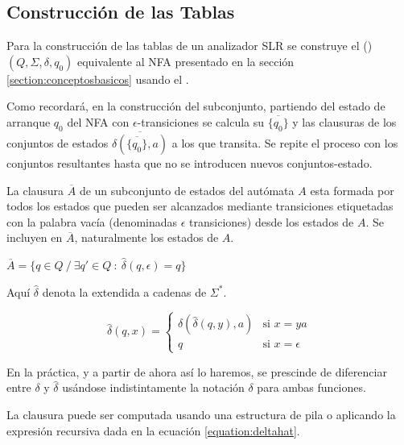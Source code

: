 \subsection{Construcción de las Tablas}
\label{subsection:nfa2dfa}

Para la construcción de las tablas de un analizador SLR
se construye el  () 
$(Q, \Sigma, \delta, q_0)$ equivalente al NFA 
presentado en la sección
\ref{section:conceptosbasicos}
usando el .

Como recordará, en la construcción del subconjunto,
partiendo del estado de arranque $q_0$ del NFA con $\epsilon$-transiciones
se calcula su  $\overline{\{q_0\}}$ y las 
clausuras de los conjuntos de estados $\overline{\delta(\overline{\{q_0\}},a)}$ 
a los que transita.  Se repite el proceso
con los conjuntos resultantes hasta que no se introducen nuevos
conjuntos-estado.

La clausura $\overline{A}$ de un subconjunto de estados del autómata $A$ esta formada
por todos los estados que pueden ser alcanzados mediante transiciones
etiquetadas con la palabra vacía (denominadas $\epsilon$ transiciones)
desde los estados de $A$. Se incluyen en $\overline{A}$, naturalmente los estados 
de $A$.

\begin{center}
$\overline{A} = \{ q \in Q\ /\  \exists q' \in Q\ :\ \hat{\delta}(q, \epsilon) = q \}$
\end{center}

Aquí $\hat{\delta}$ denota la  extendida  a cadenas
de $\Sigma^*$.

\begin{equation}
\label{equation:deltahat}
\hat{\delta}(q, x) = \left \{ \begin{array}{ll}
                         \delta(\hat{\delta}(q,y),a) & \mbox{si $x = ya$} \\
                         q & \mbox{si $x = \epsilon$} 
                      \end{array}
             \right.  
\end{equation}

En la práctica, y a partir de ahora así lo haremos, se prescinde de diferenciar
entre $\delta$ y $\hat{\delta}$ usándose indistintamente la notación
$\delta$ para ambas funciones.

La clausura puede ser computada usando una estructura de pila o aplicando 
la expresión recursiva dada en la ecuación \ref{equation:deltahat}.

